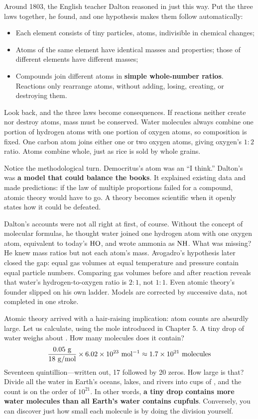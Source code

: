 Around 1803, the English teacher Dalton reasoned in just this way. Put the three laws together, he found, and one hypothesis makes them follow automatically:

\begin{itemize}[itemsep=2pt]
\item Each element consists of tiny particles, atoms, indivisible in chemical changes;
\item Atoms of the same element have identical masses and properties; those of different elements have different masses;
\item Compounds join different atoms in \textbf{simple whole-number ratios}. Reactions only rearrange atoms, without adding, losing, creating, or destroying them.
\end{itemize}

Look back, and the three laws become consequences. If reactions neither create nor destroy atoms, mass must be conserved. Water molecules always combine one portion of hydrogen atoms with one portion of oxygen atoms, so composition is fixed. One carbon atom joins either one or two oxygen atoms, giving oxygen's $1:2$ ratio. Atoms combine whole, just as rice is sold by whole grains.

Notice the methodological turn. Democritus's atom was an ``I think.'' Dalton's was \textbf{a model that could balance the books}. It explained existing data and made predictions: if the law of multiple proportions failed for a compound, atomic theory would have to go. A theory becomes scientific when it openly states how it could be defeated.

Dalton's accounts were not all right at first, of course. Without the concept of molecular formulas, he thought water joined one hydrogen atom with one oxygen atom, equivalent to today's $\mathrm{HO}$, and wrote ammonia as $\mathrm{NH}$. What was missing? He knew mass ratios but not each atom's mass. Avogadro's hypothesis later closed the gap: equal gas volumes at equal temperature and pressure contain equal particle numbers. Comparing gas volumes before and after reaction reveals that water's hydrogen-to-oxygen ratio is $2:1$, not $1:1$. Even atomic theory's founder slipped on his own ladder. Models are corrected by successive data, not completed in one stroke.

\begin{qiaoliang}
Atomic theory arrived with a hair-raising implication: atom counts are absurdly large. Let us calculate, using the mole introduced in Chapter 5. A tiny drop of water weighs about . How many molecules does it contain?
\[
\frac{\ud{0.05}{g}}{\ud{18}{g/mol}}\times \ud{6.02\times 10^{23}}{mol^{-1}} \approx 1.7\times 10^{21}\ \text{molecules}
\]
Seventeen quintillion---written out, 17 followed by 20 zeros. How large is that? Divide all the water in Earth's oceans, lakes, and rivers into cups of , and the count is on the order of $10^{21}$. In other words, \textbf{a tiny drop contains more water molecules than all Earth's water contains cupfuls}. Conversely, you can discover just how small each molecule is by doing the division yourself.
\end{qiaoliang}

